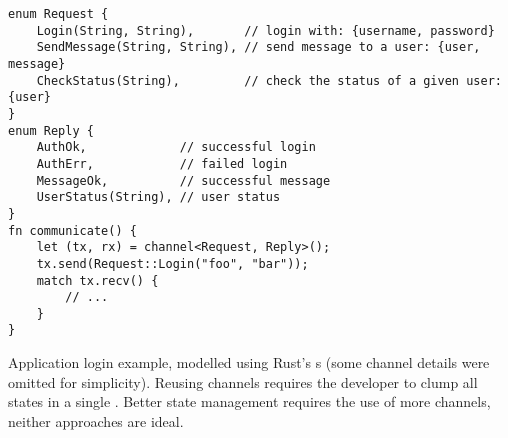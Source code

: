 \begin{listing}
    \centering
    \begin{verbatim}
enum Request {
    Login(String, String),       // login with: {username, password}
    SendMessage(String, String), // send message to a user: {user, message}
    CheckStatus(String),         // check the status of a given user: {user}
}
enum Reply {
    AuthOk,             // successful login
    AuthErr,            // failed login
    MessageOk,          // successful message
    UserStatus(String), // user status
}
fn communicate() {
    let (tx, rx) = channel<Request, Reply>();
    tx.send(Request::Login("foo", "bar"));
    match tx.recv() {
        // ...
    }
}
    \end{verbatim}
    \caption{
        Application login example, modelled using Rust's s
        (some channel details were omitted for simplicity).
        Reusing channels requires the developer to clump all states in a single .
        Better state management requires the use of more channels, neither approaches are ideal.
    }
    \label{lst:rust-login-chan}
\end{listing}